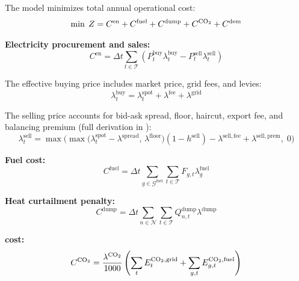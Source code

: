 \documentclass[review,3p]{elsarticle}
\begin{document}
The model minimizes total annual operational cost:
\begin{equation}
\min \; Z = C^{\mathrm{en}} + C^{\mathrm{fuel}}
+ C^{\mathrm{dump}} + C^{\ce{CO2}} + C^{\mathrm{dem}}
\label{eq:objective}
\end{equation}

\textbf{Electricity procurement and sales:}
\begin{equation}
C^{\mathrm{en}} = \Delta t \sum_{t \in \mathcal{T}} \left(
P_t^{\mathrm{buy}} \lambda_t^{\mathrm{buy}}
- P_t^{\mathrm{sell}} \lambda_t^{\mathrm{sell}} \right)
\label{eq:cost_energy}
\end{equation}

The effective buying price includes market price, grid fees, and levies:
\begin{equation}
\lambda_t^{\mathrm{buy}} = \lambda_t^{\mathrm{spot}}
+ \lambda^{\mathrm{fee}} + \lambda^{\mathrm{grid}}
\label{eq:buy_price}
\end{equation}

The selling price accounts for bid-ask spread, floor, haircut,
export fee, and balancing premium (full derivation in
):
\begin{equation}
\lambda_t^{\mathrm{sell}} = \max\!\Big(\!
\max\!\big(\lambda_t^{\mathrm{spot}} - \lambda^{\mathrm{spread}},\,
\lambda^{\mathrm{floor}}\big) (1{-}h^{\mathrm{sell}})
- \lambda^{\mathrm{sell,fee}} + \lambda^{\mathrm{sell,prem}},\; 0\Big)
\label{eq:sell_price}
\end{equation}

\textbf{Fuel cost:}
\begin{equation}
C^{\mathrm{fuel}} = \Delta t \sum_{g \in \mathcal{G}^{\mathrm{fuel}}}
\sum_{t \in \mathcal{T}} F_{g,t} \lambda_g^{\mathrm{fuel}}
\label{eq:cost_fuel}
\end{equation}

\textbf{Heat curtailment penalty:}
\begin{equation}
C^{\mathrm{dump}} = \Delta t \sum_{n \in \mathcal{N}}
\sum_{t \in \mathcal{T}} Q_{n,t}^{\mathrm{dump}} \lambda^{\mathrm{dump}}
\label{eq:cost_dump}
\end{equation}

\textbf{ cost:}
\begin{equation}
C^{\ce{CO2}} = \frac{\lambda^{\ce{CO2}}}{1000} \left(
\sum_{t} E_t^{\ce{CO2},\mathrm{grid}}
+ \sum_{g,t} E_{g,t}^{\ce{CO2},\mathrm{fuel}} \right)
\label{eq:cost_co2}
\end{equation}
\end{document}
